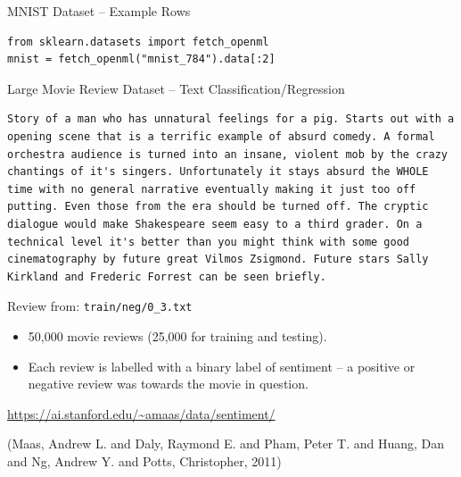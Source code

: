 \documentclass[10pt]{beamer}
\begin{document}
\begin{frame}[label={sec:org425e1de},fragile]{MNIST Dataset -- Example Rows}
 \begin{verbatim}
from sklearn.datasets import fetch_openml
mnist = fetch_openml("mnist_784").data[:2]
\end{verbatim}
\end{frame}

\begin{frame}[label={sec:org1e9f8ab},fragile]{Large Movie Review Dataset -- Text Classification/Regression}
 \begin{verbatim}
Story of a man who has unnatural feelings for a pig. Starts out with a
opening scene that is a terrific example of absurd comedy. A formal
orchestra audience is turned into an insane, violent mob by the crazy
chantings of it's singers. Unfortunately it stays absurd the WHOLE
time with no general narrative eventually making it just too off
putting. Even those from the era should be turned off. The cryptic
dialogue would make Shakespeare seem easy to a third grader. On a
technical level it's better than you might think with some good
cinematography by future great Vilmos Zsigmond. Future stars Sally
Kirkland and Frederic Forrest can be seen briefly.
\end{verbatim}

Review from: \texttt{train/neg/0\_3.txt}

\begin{itemize}
\item 50,000 movie reviews (25,000 for training and testing).
\item Each review is labelled with a binary label of sentiment -- a positive or negative
review was towards the movie in question.
\end{itemize}

\url{https://ai.stanford.edu/\~amaas/data/sentiment/}

(Maas, Andrew L. and Daly, Raymond E. and Pham, Peter T. and Huang, Dan and Ng, Andrew Y. and Potts, Christopher, 2011)
\end{frame}
\end{document}
